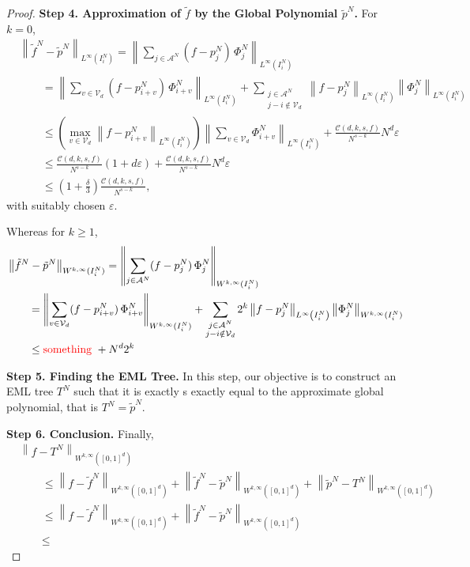 \documentclass{article}
\newcommand{\fr}{\frac}
\newcommand{\be}{\begin{equation}}
\newcommand{\ee}{\end{equation}}
\newcommand{\LnormD}[3]{\left\lVert #1 \right\rVert_{L^{#2} \left({#3}\right)}}
\newcommand{\WnormD}[4]{\left\lVert #1 \right\rVert_{W^{#2, #3} ({#4})}}
\newcommand{\WnormO}[3]{\left\lVert #1 \right\rVert_{W^{#2, #3} ([0,1]^d)}}
\newcommand{\todo}[1]{\textcolor{red}{#1}}
\numberwithin{Def}{section}
\begin{document}
\begin{proof}
{\bf{Step 4. Approximation of $\tilde{f}$ by the Global Polynomial $\tilde{p}^N$.}}
For $k = 0$,
\be\begin{aligned}
    &\LnormD{\tilde{f}^N - \tilde{p}^N}{\infty}{I_i^N} 
    = \LnormD{\sum_{j \in \mathcal{A}^N} (f - p_j^N) \, \Phi_j^N}{\infty}{I_i^N} \\
    &\qquad = \LnormD{\sum_{v \in \mathcal{V}_d} (f - p_{i + v}^N) \, \Phi_{i + v}^N}{\infty}{I_i^N} 
    + \sum_{\substack{j \in \mathcal{A}^N \\ j-i \notin \mathcal{V}_d}} \LnormD{f - p_j^N}{\infty}{I_i^N} \LnormD{\Phi_j^N}{\infty}{I_i^N} \\
    &\qquad \leq \left( \max_{v \in \mathcal{V}_d} \LnormD{f - p_{i+v}^N}{\infty}{I_i^N} \right) \LnormD{\sum_{v \in \mathcal{V}_d} \Phi_{i+v}^N}{\infty}{I_i^N} + \fr{\mathcal{C}(d,k,s,f)}{N^{s-k}} N^d \varepsilon \\
    &\qquad \leq \fr{\mathcal{C} (d,k,s,f)}{N^{s-k}}(1 + d\varepsilon) + \fr{\mathcal{C}(d,k,s,f)}{N^{s-k}}N^d \varepsilon \\
    &\qquad \leq \left( 1 + \fr{\delta}{3} \right) \fr{\mathcal{C} (d,k,s,f)}{N^{s-k}},
\end{aligned}\ee
with suitably chosen $\varepsilon$.

Whereas for $k\geq 1$,
\be\begin{aligned}
    &\WnormD{\tilde{f}^N - \tilde{p}^N}{k}{\infty}{I_i^N} 
    = \WnormD{\sum_{j \in \mathcal{A}^N} (f - p_j^N) \, \Phi_j^N}{k}{\infty}{I_i^N} \\
    &\qquad = \WnormD{\sum_{v \in \mathcal{V}_d} (f - p_{i + v}^N) \, \Phi_{i + v}^N}{k}{\infty}{I_i^N} 
    + \sum_{\substack{j \in \mathcal{A}^N \\ j-i \notin \mathcal{V}_d}} 2^k \LnormD{f - p_j^N}{\infty}{I_i^N} \WnormD{\Phi_j^N}{k}{\infty}{I_i^N} \\
    &\qquad \leq \text{\todo{something} } + N^d 2^k
\end{aligned}\ee

{\bf{Step 5. Finding the EML Tree.}}
In this step, our objective is to construct an EML tree $T^N$ such that it is exactly s exactly equal to the approximate global polynomial, that is $T^N = \tilde{p}^N$.

{\bf{Step 6. Conclusion.}}
Finally, 
\be\begin{aligned}
    &\WnormO{f - T^N}{k}{\infty} \\
        &\qquad \leq \WnormO{f - \tilde{f}^N}{k}{\infty} + \WnormO{\tilde{f}^N - \tilde{p}^N}{k}{\infty} + \WnormO{\tilde{p}^N - T^N}{k}{\infty} \\
        &\qquad \leq \WnormO{f - \tilde{f}^N}{k}{\infty} + \WnormO{\tilde{f}^N - \tilde{p}^N}{k}{\infty} \\
        &\qquad \leq 
\end{aligned}\ee


\end{proof}
\end{document}
